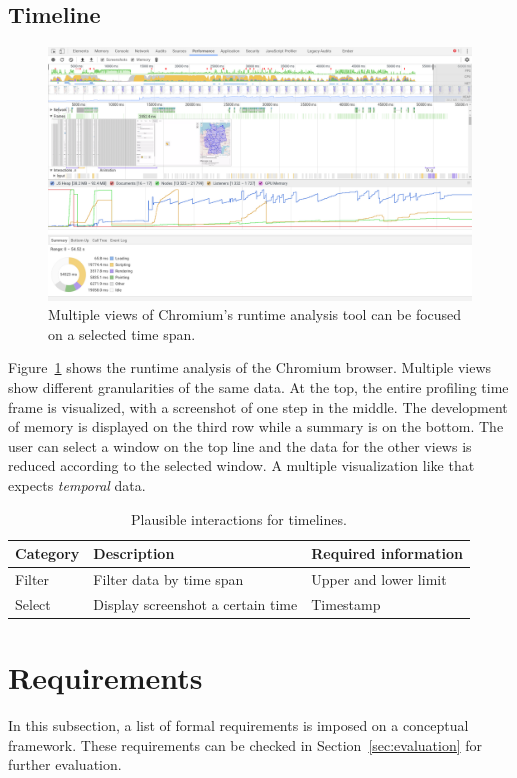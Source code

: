 \subsection{Timeline}

\begin{figure}
  \centering
    \includegraphics[width=\textwidth]{figures/analysis/profiler}
  \caption{Multiple views of Chromium's runtime analysis tool can be focused on a selected time span.}
  \label{fig:analysis:timeline}
\end{figure}
Figure~\ref{fig:analysis:timeline} shows the runtime analysis of the Chromium browser.
Multiple views show different granularities of the same data.
At the top, the entire profiling time frame is visualized, with a screenshot of one step in the middle.
The development of memory is displayed on the third row while a summary is on the bottom.
The user can select a window on the top line and the data for the other views is reduced according to the selected window.
A multiple visualization like that expects \emph{temporal} data.

\begin{table}[H]
  \caption{Plausible interactions for timelines.}%
  \label{fig:analysis:timeline:interactions}
  \begin{tabular*}{\textwidth}{lll}
    \bf Category & \bf Description & \bf Required information \\
    \hline
    Filter & Filter data by time span & Upper and lower limit \\
    Select & Display screenshot a certain time & Timestamp  \\
  \end{tabular*}
\end{table}


\section{Requirements}\label{sec:analysis:requirements}
In this subsection, a list of formal requirements is imposed on a conceptual \cmv{} framework.
These requirements can be checked in Section~\ref{sec:evaluation} for further evaluation.

